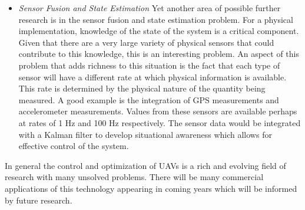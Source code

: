 \begin{itemize}
\item \textit{Sensor Fusion and State Estimation} Yet another area of possible further research is in the sensor fusion and state estimation problem. For a physical implementation, knowledge of the state of the system is a critical component. Given that there are a very large variety of physical sensors that could contribute to this knowledge, this is an interesting problem. An aspect of this problem that adds richness to this situation is the fact that each type of sensor will have a different rate at which physical information is available. This rate is determined by the physical nature of the quantity being measured. A good example is the integration of GPS measurements and accelerometer measurements. Values from these sensors are available perhaps at rates of 1 Hz and 100 Hz respectively. The sensor data would be integrated with a Kalman filter to develop situational awareness which allows for effective control of the system.
\end{itemize}

In general the control and optimization of UAVs is a rich and evolving field of research with many unsolved problems. There will be many commercial applications of this technology appearing in coming years which will be informed by future research.











